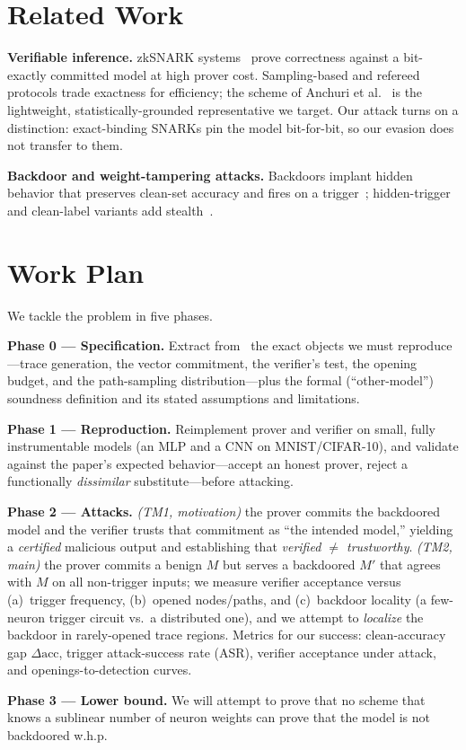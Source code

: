 \documentclass[sigconf,nonacm]{acmart}
\begin{document}
\section{Related Work}
\textbf{Verifiable inference.} zkSNARK systems~\cite{kang2022scaling,benno2026jolt} prove
correctness against a bit-exactly committed model at high prover cost. Sampling-based and
refereed protocols trade exactness for efficiency; the scheme of Anchuri et
al.~\cite{anchuri2026verifiable} is the lightweight, statistically-grounded representative we
target. Our attack turns on a distinction: exact-binding SNARKs pin the model bit-for-bit, so
our evasion does not transfer to them.

\noindent\textbf{Backdoor and weight-tampering attacks.} Backdoors implant hidden behavior that
preserves clean-set accuracy and fires on a trigger~\cite{gu2019badnets}; hidden-trigger and
clean-label variants add stealth~\cite{saha2020hidden}.

\section{Work Plan}
We tackle the problem in five phases.

\noindent\textbf{Phase 0 --- Specification.} Extract from~\cite{anchuri2026verifiable} the exact
objects we must reproduce---trace generation, the vector commitment, the verifier's test, the
opening budget, and the path-sampling distribution---plus the formal (``other-model'') soundness
definition and its stated assumptions and limitations.

\noindent\textbf{Phase 1 --- Reproduction.} Reimplement prover and verifier on small, fully
instrumentable models (an MLP and a CNN on MNIST/CIFAR-10), and validate against the paper's expected behavior---accept an honest prover,
reject a functionally \emph{dissimilar} substitute---before attacking.

\noindent\textbf{Phase 2 --- Attacks.} \emph{(TM1, motivation)} the prover commits the backdoored
model and the verifier trusts that commitment as ``the intended model,'' yielding a
\emph{certified} malicious output and establishing that \emph{verified $\neq$ trustworthy}.
\emph{(TM2, main)} the prover commits a benign $M$ but serves a backdoored $M'$ that agrees with
$M$ on all non-trigger inputs; we measure verifier acceptance versus (a)~trigger frequency,
(b)~opened nodes/paths, and (c)~backdoor locality (a few-neuron trigger circuit vs.\ a distributed
one), and we attempt to \emph{localize} the backdoor in rarely-opened trace regions. Metrics for our success:
clean-accuracy gap $\Delta\mathrm{acc}$, trigger attack-success rate (ASR), verifier acceptance
under attack, and openings-to-detection curves.

\noindent\textbf{Phase 3 --- Lower bound.} We will attempt to prove that no scheme that knows a sublinear number of neuron weights can prove that the model is not backdoored w.h.p. 


{\small}
\end{document}
